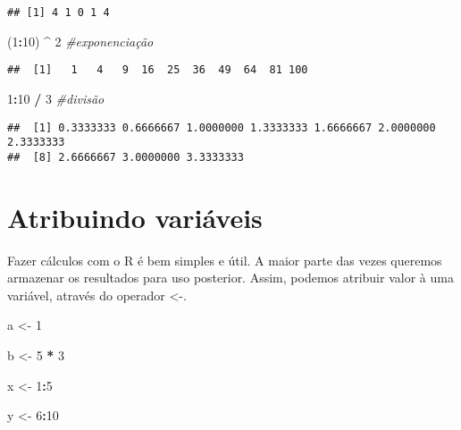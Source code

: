 \documentclass[]{book}
\newenvironment{Shaded}{\begin{snugshade}}{\end{snugshade}}
\newcommand{\CommentTok}[1]{\textcolor[rgb]{0.56,0.35,0.01}{\textit{#1}}}
\newcommand{\DecValTok}[1]{\textcolor[rgb]{0.00,0.00,0.81}{#1}}
\newcommand{\NormalTok}[1]{#1}
\newcommand{\OperatorTok}[1]{\textcolor[rgb]{0.81,0.36,0.00}{\textbf{#1}}}
\newcommand{\StringTok}[1]{\textcolor[rgb]{0.31,0.60,0.02}{#1}}
\theoremstyle{definition}
\theoremstyle{definition}
\theoremstyle{definition}
\theoremstyle{remark}
\begin{document}
\begin{verbatim}
## [1] 4 1 0 1 4
\end{verbatim}

\begin{Shaded}
\begin{Highlighting}[]
\NormalTok{(}\DecValTok{1}\OperatorTok{:}\DecValTok{10}\NormalTok{) }\OperatorTok{^}\StringTok{ }\DecValTok{2}                        \CommentTok{#exponenciação}
\end{Highlighting}
\end{Shaded}

\begin{verbatim}
##  [1]   1   4   9  16  25  36  49  64  81 100
\end{verbatim}

\begin{Shaded}
\begin{Highlighting}[]
\DecValTok{1}\OperatorTok{:}\DecValTok{10} \OperatorTok{/}\StringTok{ }\DecValTok{3}                        \CommentTok{#divisão}
\end{Highlighting}
\end{Shaded}

\begin{verbatim}
##  [1] 0.3333333 0.6666667 1.0000000 1.3333333 1.6666667 2.0000000 2.3333333
##  [8] 2.6666667 3.0000000 3.3333333
\end{verbatim}

\hypertarget{atribuindo-variuxe1veis}{%
\section{Atribuindo variáveis}\label{atribuindo-variuxe1veis}}

Fazer cálculos com o R é bem simples e útil.
A maior parte das vezes queremos armazenar os resultados para uso posterior.
Assim, podemos atribuir valor à uma variável, através do operador \textless{}-.

\begin{Shaded}
\begin{Highlighting}[]
\NormalTok{a <-}\StringTok{ }\DecValTok{1}

\NormalTok{b <-}\StringTok{ }\DecValTok{5} \OperatorTok{*}\StringTok{ }\DecValTok{3}

\NormalTok{x <-}\StringTok{ }\DecValTok{1}\OperatorTok{:}\DecValTok{5}

\NormalTok{y <-}\StringTok{ }\DecValTok{6}\OperatorTok{:}\DecValTok{10}
\end{Highlighting}
\end{Shaded}
\end{document}
